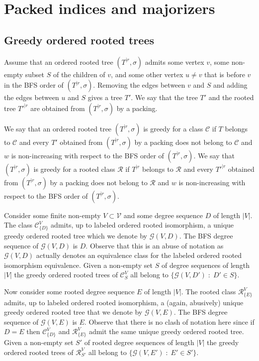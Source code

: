 \documentclass[11 pt]{modarticle}
\newcommand{\vset}{\mathcal{V}}
\newcommand{\wmap}{w}
\newcommand{\size}[1]{|#1|}
\newcommand{\rtree}[2]{{#1}^{\lvert #2}}
\newcommand{\ortree}[3]{(\rtree{#1}{#2},{#3})}
\newcommand{\tclass}{\mathcal{C}}
\newcommand{\rtclass}{\mathcal{R}}
\newcommand{\greedy}[2]{\mathcal{G}(#1,#2)}
\newcommand{\pclass}[2]{\tclass^{#1}_{#2}}
\newcommand{\rpclass}[2]{\rtclass^{#1}_{#2}}
\begin{document}
\section{Packed indices and majorizers}

\subsection{Greedy ordered rooted trees}

\begin{defi}
Assume that an ordered rooted tree $\ortree{T}{r}{\sigma}$ admits some vertex $v$, some non-empty subset $S$ of the children of $v$, and some other vertex $u \neq v$ that is before $v$ in the BFS order of $\ortree{T}{r}{\sigma}$. Removing the edges between $v$ and $S$ and adding the edges between $u$ and $S$ gives a tree $T'$. We say that the tree $T'$ and the rooted tree $\rtree{T'}{r}$ are obtained from $\ortree{T}{r}{\sigma}$ by a packing.
\end{defi}

\begin{defi}
We say that an ordered rooted tree $\ortree{T}{r}{\sigma}$ is greedy for a class $\tclass$ if $T$ belongs to $\tclass$ and every $T'$ obtained from $\ortree{T}{r}{\sigma}$ by a packing does not belong to $\tclass$ and $\wmap$ is non-increasing with respect to the BFS order of $\ortree{T}{r}{\sigma}$. We say that $\ortree{T}{r}{\sigma}$ is greedy for a rooted class $\rtclass$ if $\rtree{T}{r}$ belongs to $\rtclass$ and every $\rtree{T'}{r}$ obtained from $\ortree{T}{r}{\sigma}$ by a packing does not belong to $\rtclass$ and $\wmap$ is non-increasing with respect to the BFS order of $\ortree{T}{r}{\sigma}$.
\end{defi}

Consider some finite non-empty $V \subset \vset$ and some degree sequence $D$ of length $\size{V}$. The class $\pclass{V}{\{D\}}$ admits, up to labeled ordered rooted isomorphism, a unique greedy ordered rooted tree which we denote by $\greedy{V}{D}$. The BFS degree sequence of $\greedy{V}{D}$ is $D$. Observe that this is an abuse of notation as $\greedy{V}{D}$ actually denotes an equivalence class for the labeled ordered rooted isomorphism equivalence. Given a non-empty set $S$ of degree sequences of length $\size{V}$ the greedy ordered rooted trees of $\pclass{V}{S}$ all belong to $\{\greedy{V}{D'} \;:\; D' \in S\}$.

Now consider some rooted degree sequence $E$ of length $\size{V}$. The rooted class $\rpclass{V}{\{E\}}$ admits, up to labeled ordered rooted isomorphism, a (again, abusively) unique greedy ordered rooted tree that we denote by $\greedy{V}{E}$. The BFS degree sequence of $\greedy{V}{E}$ is $E$. Observe that there is no clash of notation here since if $D = E$ then $\pclass{V}{\{D\}}$ and $\rpclass{V}{\{E\}}$ admit the same unique greedy ordered rooted tree. Given a non-empty set $S'$ of rooted degree sequences of length $\size{V}$ the greedy ordered rooted trees of $\rpclass{V}{S'}$ all belong to $\{\greedy{V}{E'} \;:\; E' \in S'\}$. 
\end{document}
